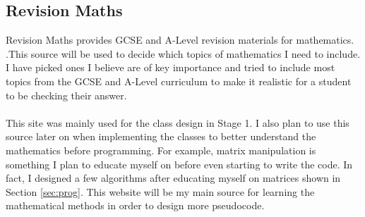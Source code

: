 \documentclass[final]{cmpreport}
\begin{document}
	
	
	\subsection{Revision Maths}
	
	Revision Maths provides GCSE and A-Level revision materials for mathematics. \cite{revision}.This source will be used to decide which topics of mathematics I need to include. I have picked ones I believe are of key importance and tried to include most topics from the GCSE and A-Level curriculum to make it realistic for a student to be checking their answer.\\
	\\This site was mainly used for the class design in Stage 1. I also plan to use this source later on when implementing the classes to better understand the mathematics before programming. For example, matrix manipulation is something I plan to educate myself on before even starting to write the code. In fact, I designed a few algorithms after educating myself on matrices shown in Section \ref{sec:prog}. This website will be my main source for learning the mathematical methods in order to design more pseudocode. \\
	
\end{document}
